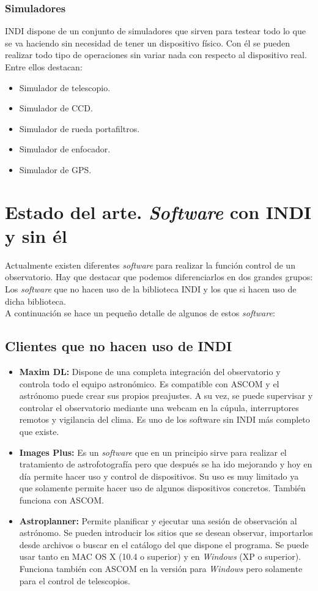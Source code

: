 \subsubsection{Simuladores}
INDI dispone de un conjunto de simuladores que sirven para testear todo lo que se va haciendo sin necesidad de tener un dispositivo físico. Con él se pueden realizar todo tipo de operaciones sin variar nada con respecto al dispositivo real. Entre ellos destacan:
\begin{itemize}
  \item Simulador de telescopio.
  \item Simulador de CCD.
  \item Simulador de rueda portafiltros.
  \item Simulador de enfocador.
  \item Simulador de GPS.
\end{itemize}

\section{Estado del arte. \textit{Software} con INDI y sin él}
Actualmente existen diferentes \textit{software} para realizar la función control de un observatorio. Hay que destacar que podemos diferenciarlos en dos grandes grupos: Los \textit{software} que no hacen uso de la biblioteca INDI y los que si hacen uso de dicha biblioteca.\\

A continuación se hace un pequeño detalle de algunos de estos \textit{software}:

\subsection{Clientes que no hacen uso de INDI}
\begin{itemize}
  \item \textbf{Maxim DL:} Dispone de una completa integración del observatorio y controla todo el equipo astronómico. Es compatible con ASCOM y el astrónomo puede crear sus propios preajustes. A su vez, se puede supervisar y controlar el observatorio mediante una webcam en la cúpula, interruptores remotos y vigilancia del clima. Es uno de los software sin INDI más completo que existe.\cite{MaximDL}
  \item \textbf{Images Plus:} Es un \textit{software} que en un principio sirve para realizar el tratamiento de astrofotografía pero que después se ha ido mejorando y hoy en día permite hacer uso y control de dispositivos. Su uso es muy limitado ya que solamente permite hacer uso de algunos dispositivos concretos. También funciona con ASCOM.\cite{ImagesPlus}
  \item \textbf{Astroplanner:} Permite planificar y ejecutar una sesión de observación al astrónomo. Se pueden introducir los sitios que se desean observar, importarlos desde archivos o buscar en el catálogo del que dispone el programa. Se puede usar tanto en MAC OS X (10.4 o superior) y en \textit{Windows} (XP o superior). Funciona también con ASCOM en la versión para \textit{Windows} pero solamente para el control de telescopios.\cite{Astroplanner}
\end{itemize}

